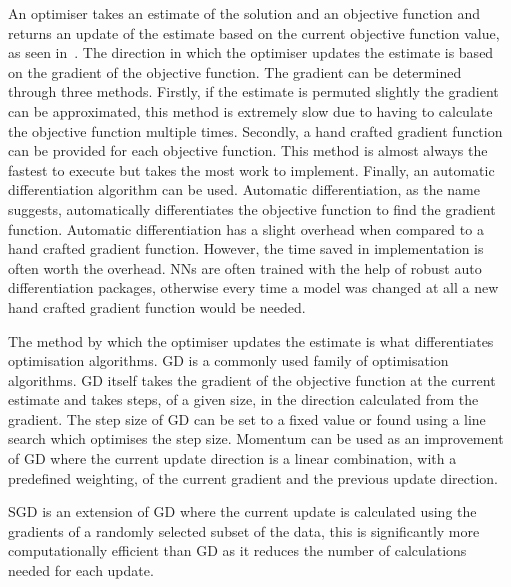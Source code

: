                 An optimiser takes an estimate of the solution and an objective function and returns an update of the estimate based on the current objective function value, as seen in~. The direction in which the optimiser updates the estimate is based on the gradient of the objective function. The gradient can be determined through three methods. Firstly, if the estimate is permuted slightly the gradient can be approximated, this method is extremely slow due to having to calculate the objective function multiple times. Secondly, a hand crafted gradient function can be provided for each objective function. This method is almost always the fastest to execute but takes the most work to implement. Finally, an automatic differentiation algorithm can be used. Automatic differentiation, as the name suggests, automatically differentiates the objective function to find the gradient function. Automatic differentiation has a slight overhead when compared to a hand crafted gradient function. However, the time saved in implementation is often worth the overhead. \glspl{NN} are often trained with the help of robust auto differentiation packages, otherwise every time a model was changed at all a new hand crafted gradient function would be needed.
                
                The method by which the optimiser updates the estimate is what differentiates optimisation algorithms. \gls{GD} is a commonly used family of optimisation algorithms. \gls{GD} itself takes the gradient of the objective function at the current estimate %
                and takes steps, of a given size, in the direction calculated from the gradient. %
                The step size of \gls{GD} can be set to a fixed value or found using a line search which optimises the step size. Momentum can be used as an improvement of \gls{GD} where the current update direction is a linear combination, with a predefined weighting, of the current gradient and the previous update direction.
                
                \gls{SGD} is an extension of \gls{GD} where the current update is calculated using the gradients of a randomly selected subset of the data, %
                this is significantly more computationally efficient than \gls{GD} as it reduces the number of calculations needed for each update.
                
